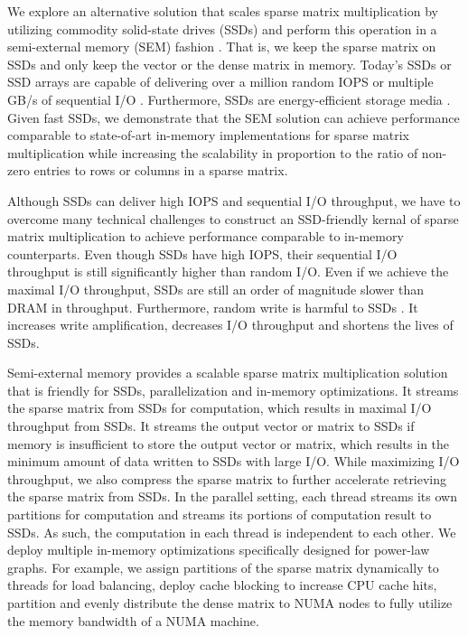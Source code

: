 We explore an alternative solution that scales sparse matrix multiplication
by utilizing commodity solid-state drives (SSDs) and perform this operation
in a semi-external memory (SEM) fashion \cite{flashgraph, Abello98}.
That is, we keep the sparse matrix on SSDs and only keep the vector or
the dense matrix in memory. Today's SSDs or SSD arrays are capable of delivering
over a million random IOPS or multiple GB/s of sequential I/O \cite{safs}.
Furthermore, SSDs are energy-efficient storage media \cite{}. Given fast SSDs,
we demonstrate that the SEM solution
can achieve performance comparable to state-of-art in-memory implementations
for sparse matrix multiplication while increasing the scalability in proportion
to the ratio of non-zero entries to rows or columns in a sparse matrix.


Although SSDs can deliver high IOPS and sequential I/O throughput, we have
to overcome many technical challenges to construct an SSD-friendly kernal
of sparse matrix multiplication to achieve performance comparable to in-memory
counterparts. Even though SSDs have high IOPS, their sequential I/O throughput
is still significantly higher than random I/O. Even if we achieve
the maximal I/O throughput, SSDs are still an order of magnitude slower
than DRAM in throughput. Furthermore, random write is harmful to SSDs
\cite{sfs}. It increases write amplification, decreases I/O throughput
and shortens the lives of SSDs.

Semi-external memory provides a scalable sparse matrix multiplication solution
that is friendly for SSDs, parallelization and in-memory optimizations.
It streams the sparse matrix from SSDs for computation, which results in maximal
I/O throughput from SSDs. It streams the output vector or matrix to SSDs if
memory is insufficient to store the output vector or matrix, which results in
the minimum amount of data written to SSDs with large I/O. While maximizing I/O
throughput, we also compress
the sparse matrix to further accelerate retrieving the sparse matrix from SSDs.
In the parallel setting, each thread streams its own partitions for computation
and streams its portions of computation result to SSDs. As such, the computation
in each thread is independent to each other.
We deploy multiple in-memory optimizations specifically designed for power-law
graphs. For example, we assign partitions of the sparse matrix dynamically to
threads for load balancing, deploy cache blocking to increase CPU cache hits,
partition and evenly distribute the dense matrix to NUMA nodes to fully utilize
the memory bandwidth of a NUMA machine.

